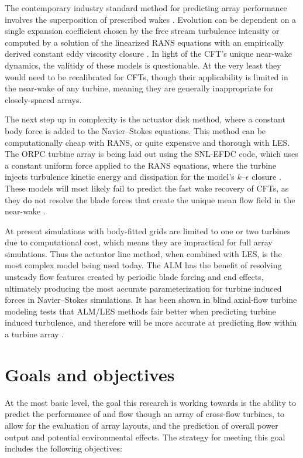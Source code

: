 The contemporary industry standard method for predicting array performance
involves the superposition of prescribed wakes \cite{Stevens2014b}. Evolution
can be dependent on a single expansion coefficient chosen by the free stream
turbulence intensity \cite{Jensen1983, Choi2013} or computed by a solution of
the linearized RANS equations with an empirically derived constant eddy
viscosity closure \cite{Ainslie1988}. In light of the CFT's unique near-wake
dynamics, the valitidy of these models is questionable. At the very least they
would need to be recalibrated for CFTs, though their applicability is limited in
the near-wake of any turbine, meaning they are generally inappropriate for
closely-spaced arrays.
	
The next step up in complexity is the actuator disk method, where a constant
body force is added to the Navier--Stokes equations. This method can be
computationally cheap with RANS, or quite expensive and thorough with LES. The
ORPC turbine array is being laid out using the SNL-EFDC code, which uses a
constant uniform force applied to the RANS equations, where the turbine injects
turbulence kinetic energy and dissipation for the model's $k$--$\epsilon$
closure \cite{Nelson2013}. These models will most likely fail to predict the
fast wake recovery of CFTs, as they do not resolve the blade forces that create
the unique mean flow field in the near-wake \cite{Bachant2015-JoT}.
	
At present simulations with body-fitted grids are limited to one or two turbines
due to computational cost, which means they are impractical for full array
simulations. Thus the actuator line method, when combined with LES, is the most
complex model being used today. The ALM has the benefit of resolving unsteady
flow features created by periodic blade forcing and end effects, ultimately
producing the most accurate parameterization for turbine induced forces in
Navier--Stokes simulations. It has been shown in blind axial-flow turbine
modeling tests that ALM/LES methods fair better when predicting turbine induced
turbulence, and therefore will be more accurate at predicting flow within a
turbine array \cite{Krogstad2013}.


\section{Goals and objectives}

At the most basic level, the goal this research is working towards is the
ability to predict the performance of and flow though an array of cross-flow
turbines, to allow for the evaluation of array layouts, and the prediction of
overall power output and potential environmental effects. The strategy for
meeting this goal includes the following objectives:

